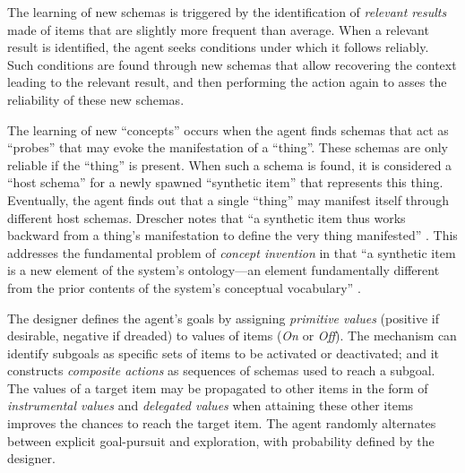 \documentclass[runningheads]{llncs}
\begin{document}
The learning of new schemas is triggered by the identification of \textit{relevant results} made of items that are slightly more frequent than average. 
When a relevant result is identified, the agent seeks conditions under which it follows reliably. 
Such conditions are found through new schemas that allow recovering the context leading to the relevant result, and then performing the action again to asses the reliability of these new schemas. 

The learning of new ``concepts'' occurs when the agent finds schemas that act as ``probes'' that may evoke the manifestation of a ``thing''. 
These schemas are only reliable if the ``thing'' is present. 
When such a schema is found, it is considered a ``host schema'' for a newly spawned ``synthetic item'' that represents this thing.
Eventually, the agent finds out that a single ``thing'' may manifest itself through different host schemas. 
Drescher notes that ``a synthetic item thus works backward from a thing's manifestation to define the very thing manifested'' \cite[p. 83]{drescher_made-up_1991}.
This addresses the fundamental problem of \textit{concept invention} in that 
``a synthetic item is a new element of the system's ontology---an element fundamentally different from the prior contents of the system's conceptual vocabulary'' \cite[p. 81]{drescher_made-up_1991}.

The designer defines the agent's goals by assigning \textit{primitive values} (positive if desirable, negative if dreaded) to values of items (\textit{On} or \textit{Off}).
The mechanism can identify subgoals as specific sets of items to be activated or deactivated; 
and it constructs \textit{composite actions} as sequences of schemas used to reach a subgoal.
The values of a target item may be propagated to other items in the form of \textit{instrumental values} and \textit{delegated values} when attaining these other items improves the chances to reach the target item. 
The agent randomly alternates between explicit goal-pursuit and exploration, with probability defined by the designer.

\end{document}
